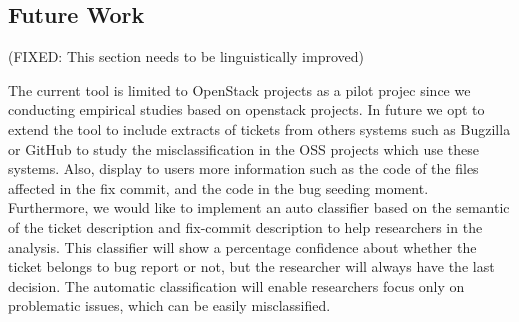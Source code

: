 \documentclass[runningheads,a4paper]{llncs}
\begin{document}



\subsection{Future Work}
\label{sec:5.1}


(FIXED: This section needs to be linguistically improved)

The current tool is limited to OpenStack projects as a pilot projec since we conducting empirical studies based on openstack projects. In future we opt to extend the tool to include extracts of tickets from others systems such as Bugzilla or GitHub to study the misclassification in the OSS projects which use these systems. Also, display to users more information such as the code of the files affected in the fix commit, and the code in the bug seeding moment. Furthermore, we would like to implement an auto classifier based on the semantic of the ticket description and fix-commit description to help researchers in the analysis. This classifier will show a percentage confidence about whether the ticket belongs to bug report or not, but the researcher will always have the last decision. The automatic classification will enable researchers focus only on problematic issues, which can be easily misclassified. \\
\end{document}

